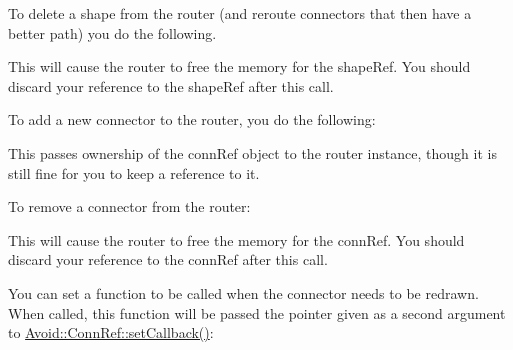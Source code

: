 To delete a shape from the router (and reroute connectors that then have a better path) you do the following. ~\newline
 
\begin{DoxyCode}{0}

\end{DoxyCode}
 This will cause the router to free the memory for the shape\+Ref. You should discard your reference to the shape\+Ref after this call.

To add a new connector to the router, you do the following\+: 
\begin{DoxyCode}{0}

\end{DoxyCode}
 This passes ownership of the conn\+Ref object to the router instance, though it is still fine for you to keep a reference to it.

To remove a connector from the router\+: 
\begin{DoxyCode}{0}

\end{DoxyCode}
 This will cause the router to free the memory for the conn\+Ref. You should discard your reference to the conn\+Ref after this call.

You can set a function to be called when the connector needs to be redrawn. When called, this function will be passed the pointer given as a second argument to \mbox{\hyperlink{class_avoid_1_1_conn_ref_a9d1a26643759adbb84f350285ce42d64}{Avoid\+::\+Conn\+Ref\+::set\+Callback()}}\+: 
\begin{DoxyCode}{0}
\DoxyCodeLine{\{}
\DoxyCodeLine{\}}

\end{DoxyCode}


